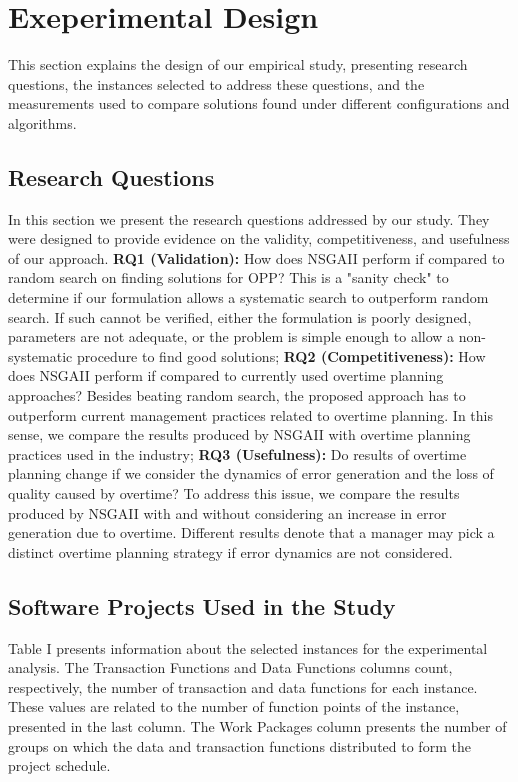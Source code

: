 \documentclass[conference]{IEEEtran}
\begin{document}
\section{Exeperimental Design}
This section explains the design of our empirical study, presenting research questions, the instances selected to address these questions, and the measurements used to compare solutions found under different configurations and algorithms.
\subsection{Research Questions}

In this section we present the research questions addressed by our study. They were designed to provide evidence on the validity, competitiveness, and usefulness of our approach.
\textbf{RQ1 (Validation):} How does NSGAII perform if compared to random search on finding solutions for OPP? This is a "sanity check" to determine if our formulation allows a systematic search to outperform random search. If such cannot be verified, either the formulation is poorly designed, parameters are not adequate, or the problem is simple enough to allow a non-systematic procedure to find good solutions; \linebreak
\textbf{RQ2 (Competitiveness):} How does NSGAII perform if compared to currently used overtime planning approaches? Besides beating random search, the proposed approach has to outperform current management practices related to overtime planning. In this sense, we compare the results produced by NSGAII with overtime planning practices used in the industry; \linebreak
\textbf{RQ3 (Usefulness):} Do results of overtime planning change if we consider the dynamics of error generation and the loss of quality caused by overtime? To address this issue, we compare the results produced by NSGAII with and without considering an increase in error generation due to overtime. Different results denote that a manager may pick a distinct overtime planning strategy if error dynamics are not considered.

\subsection{Software Projects Used in the Study}

Table I presents information about the selected instances for the experimental analysis. The Transaction Functions and Data Functions columns count, respectively, the number of transaction and data functions for each instance. These values are related to the number of function points of the instance, presented in the last column. The Work Packages column presents the number of groups on which the data and transaction functions distributed to form the project schedule.
\end{document}
